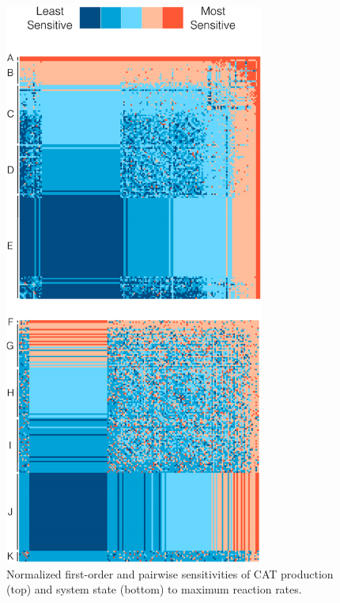 \documentclass[12pt]{article}
\begin{document}
\begin{figure}[ht]
\centering
\includegraphics[width=0.76\textwidth,trim=0 28 615 40,clip]{./Figures/Sensitivity.pdf}
\caption{Normalized first-order and pairwise sensitivities of CAT production (top) and system state (bottom) to maximum reaction rates.}
\label{fig:Sensitivity}
\end{figure}
\end{document}
